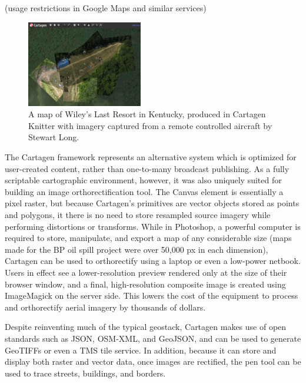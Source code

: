 \documentclass[11pt]{report}
\begin{document}
(usage restrictions in Google Maps and similar services)

\begin{figure}
	\begin{flushright}
		\includegraphics[width=0.45\textwidth]{images/knitter-wileys.png}
		\caption{A map of Wiley's Last Resort in Kentucky, produced in Cartagen Knitter with imagery captured from a remote controlled aircraft by Stewart Long.}
	\end{flushright}
\end{figure}

The Cartagen framework represents an alternative system which is optimized for user-created content, rather than one-to-many broadcast publishing. As a fully scriptable cartographic environment, however, it was also uniquely suited for building an image orthorectification tool. The Canvas element is essentially a pixel raster, but because Cartagen's primitives are vector objects stored as points and polygons, it there is no need to store resampled source imagery while performing distortions or transforms. While in Photoshop, a powerful computer is required to store, manipulate, and export a map of any considerable size (maps made for the BP oil spill project were over 50,000 px in each dimension), Cartagen can be used to orthorectify using a laptop or even a low-power netbook. Users in effect see a lower-resolution preview rendered only at the size of their browser window, and a final, high-resolution composite image is created using ImageMagick on the server side. This lowers the cost of the equipment to process and orthorectify aerial imagery by thousands of dollars. 



Despite reinventing much of the typical geostack, Cartagen makes use of open standards such as JSON, OSM-XML, and GeoJSON, and can be used to generate \ac{GeoTIFF}s or even a \ac{TMS} tile service. In addition, because it can store and display both raster and vector data, once images are rectified, the pen tool can be used to trace streets, buildings, and borders.   
\end{document}
